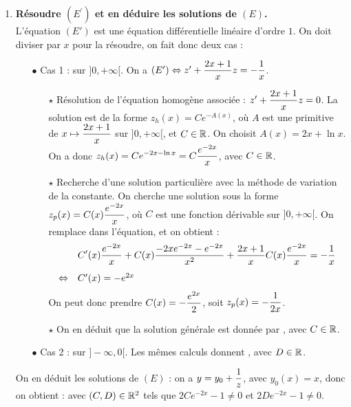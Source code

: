 \documentclass[a4paper, 11pt,reqno]{article}
\begin{document}
\begin{correction}
\begin{enumerate}
\item \textbf{R\'esoudre $(E^{\prime})$ et en d\'eduire les solutions de $(E)$.}\\
L'\'equation $(E')$ est une \'equation diff\'erentielle lin\'eaire d'ordre $1$. On doit diviser par $x$ pour la r\'esoudre, on fait donc deux cas :
\begin{itemize}
\item[$\bullet$] Cas 1 : sur $]0, +\infty[$. On a $(E') \Leftrightarrow z' + \displaystyle \frac{2 x+1}{x} z = - \frac{1}{x}$.
\begin{itemize}
\item[$\star$] R\'esolution de l'\'equation homog\`ene associ\'ee : $z' + \displaystyle \frac{2 x+1}{x} z = 0$. La solution est de la forme $z_h(x) = C e^{-A(x)}$, o\`u $A$ est une primitive de $x \mapsto \displaystyle \frac{2x+1}{x}$ sur $]0, +\infty[$, et $C \in \mathbb{R}$. On choisit $A(x) = 2x + \ln x$. On a donc $z_h(x) = \displaystyle C e^{-2x -\ln x} = C \frac{e^{-2x}}{x}$, avec $C\in \mathbb{R}$.
\item[$\star$] Recherche d'une solution particuli\`ere avec la m\'ethode de variation de la constante. On cherche une solution sous la forme $z_p(x) = \displaystyle C(x) \frac{e^{-2x}}{x}$, o\`u $C$ est une fonction d\'erivable sur $]0, +\infty[$. On remplace dans l'\'equation, et on obtient :
$$\begin{array}{cl}
& \ddp C'(x) \frac{e^{-2x}}{x} + C(x) \frac{-2xe^{-2x}-e^{-2x}}{x^2} +  \frac{2 x+1}{x} C(x) \frac{e^{-2x}}{x} = - \frac{1}{x}\vsec\\
\Leftrightarrow & C'(x) = -e^{2x}
\end{array}$$
On peut donc prendre $C(x) = - \displaystyle \frac{e^{2x}}{2}$, soit $z_p(x) = \displaystyle - \frac{1}{2x}$.
\item[$\star$] On en d\'eduit que la solution g\'en\'erale est donn\'ee par , avec $C \in \mathbb{R}$.
\end{itemize}
\item[$\bullet$] Cas 2 : sur $]-\infty,0[$. Les m\^emes calculs donnent , avec $D \in \mathbb{R}$.
\end{itemize}
On en d\'eduit les solutions de $(E)$ : on a $y=y_0+\displaystyle\frac{1}{z}$, avec $y_0(x) = x$, donc on obtient :  avec $(C,D) \in \mathbb{R}^2$ tels que $2C e^{-2x}-1\not=0$ et $2D e^{-2x}-1\not=0$.
\end{enumerate}
\end{correction}
\end{document}
